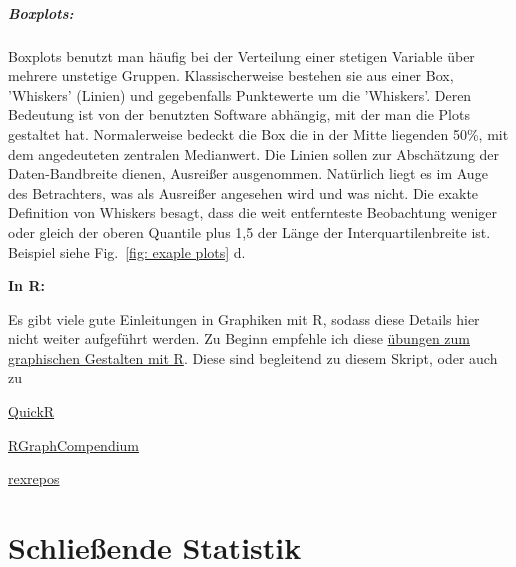 \documentclass[a4paper,twoside]{tufte-book}\usepackage[]{graphicx}\usepackage[]{color}
\begin{document}
\paragraph{Boxplots:} Boxplots benutzt man häufig bei der Verteilung einer stetigen Variable über mehrere unstetige Gruppen. Klassischerweise bestehen sie aus einer Box, 'Whiskers' (Linien) und gegebenfalls Punktewerte um die 'Whiskers'. Deren Bedeutung ist von der benutzten Software abhängig, mit der man die Plots gestaltet hat. Normalerweise bedeckt die Box die in der Mitte liegenden 50\%, mit dem angedeuteten zentralen Medianwert. Die Linien sollen zur Abschätzung der Daten-Bandbreite dienen, Ausreißer ausgenommen. Natürlich liegt es im Auge des Betrachters, was als Ausreißer angesehen wird und was nicht. Die exakte Definition von Whiskers besagt, dass die weit entfernteste Beobachtung weniger oder gleich der oberen Quantile plus 1,5 der Länge der Interquartilenbreite ist. Beispiel siehe Fig.~\ref{fig: exaple plots} d.

\vspace{1cm}
\begin{fullwidth}
\begin{mdframed}
    
\textbf{In R:} 

Es gibt viele gute Einleitungen in Graphiken mit R, sodass diese Details hier nicht weiter aufgeführt werden. Zu Beginn empfehle ich diese  \href{https://github.com/florianhartig/ResearchSkills/tree/master/Labs/Statistics/Practicals/GraphicsInR}{übungen zum graphischen Gestalten mit R}. Diese sind begleitend zu diesem Skript, oder auch zu

\begin{itemize*}
  \item \href{http://www.statmethods.net/graphs/index.html}{QuickR}
  \item \href{http://shinyapps.org/apps/RGraphCompendium/index.php}{RGraphCompendium}
  \item \href{http://www.uni-kiel.de/psychologie/rexrepos/rerDiagrams.html}{rexrepos}
\end{itemize*}

\end{mdframed}
\end{fullwidth} 


\chapter{Schließende Statistik}\label{ch: inductive statistics}
\end{document}
